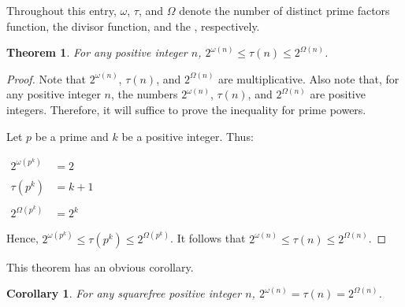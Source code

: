 \documentclass[12pt]{article}
\newtheorem*{thm*}{Theorem}
\newtheorem*{cor*}{Corollary}
\begin{document}
Throughout this entry, $\omega$, $\tau$, and $\Omega$ denote the number of distinct prime factors function, the divisor function, and the , respectively.

\begin{thm*}
For any positive integer $n$, $2^{\omega(n)} \le \tau(n) \le 2^{\Omega(n)}$.
\end{thm*}

\begin{proof}
Note that $2^{\omega(n)}$, $\tau(n)$, and $2^{\Omega(n)}$ are multiplicative.  Also note that, for any positive integer $n$, the numbers $2^{\omega(n)}$, $\tau(n)$, and $2^{\Omega(n)}$ are positive integers.  Therefore, it will suffice to prove the inequality for prime powers.

Let $p$ be a prime and $k$ be a positive integer.  Thus:

\begin{center}
$\begin{array}{rl}
\displaystyle 2^{\omega(p^k)} & =2 \\
\\
\tau(p^k) & =k+1 \\
\\
\displaystyle 2^{\Omega(p^k)} & = 2^k \end{array}$
\end{center}

Hence, $2^{\omega(p^k)} \le \tau(p^k) \le 2^{\Omega(p^k)}$.  It follows that $2^{\omega(n)} \le \tau(n) \le 2^{\Omega(n)}$.
\end{proof}

This theorem has an obvious corollary.

\begin{cor*}
For any squarefree positive integer $n$, $2^{\omega(n)}=\tau(n)=2^{\Omega(n)}$.
\end{cor*}
\end{document}
